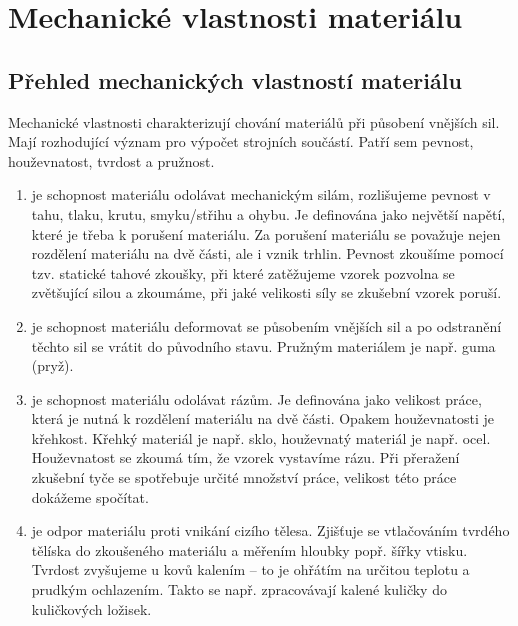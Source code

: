 \documentclass[letterpaper,10pt,english]{jupyterBook}
\begin{document}
\chapter{Mechanické vlastnosti materiálu}
\label{\detokenize{Prednasky/2_1_Mechanick_xe9_vlastnosti_materi_xe1lu:mechanicke-vlastnosti-materialu}}\label{\detokenize{Prednasky/2_1_Mechanick_xe9_vlastnosti_materi_xe1lu::doc}}

\section{Přehled mechanických vlastností materiálu}
\label{\detokenize{Prednasky/2_1_Mechanick_xe9_vlastnosti_materi_xe1lu:prehled-mechanickych-vlastnosti-materialu}}
\sphinxAtStartPar
Mechanické vlastnosti charakterizují chování materiálů při působení vnějších sil. Mají rozhodující význam pro výpočet strojních součástí. Patří sem pevnost, houževnatost, tvrdost a pružnost.
\begin{enumerate}
%
\item {} 
\sphinxAtStartPar
{} je schopnost materiálu odolávat mechanickým silám, rozlišujeme pevnost v tahu, tlaku, krutu, smyku/střihu a ohybu. Je definována jako největší napětí, které je třeba k porušení materiálu. Za porušení materiálu se považuje nejen rozdělení materiálu na dvě části, ale i vznik trhlin. Pevnost zkoušíme pomocí tzv. statické tahové zkoušky, při které zatěžujeme vzorek pozvolna se zvětšující silou a zkoumáme, při jaké velikosti síly se zkušební vzorek poruší.

\item {} 
\sphinxAtStartPar
{} je schopnost materiálu deformovat se působením vnějších sil a po odstranění těchto sil se vrátit do původního stavu. Pružným materiálem je např. guma (pryž).

\item {} 
\sphinxAtStartPar
{} je schopnost materiálu odolávat rázům. Je definována jako velikost práce, která je nutná k rozdělení materiálu na dvě části. Opakem houževnatosti je křehkost. Křehký materiál je např. sklo, houževnatý materiál je např. ocel. Houževnatost se zkoumá tím, že vzorek vystavíme rázu. Při přeražení zkušební tyče se spotřebuje určité množství práce, velikost této práce dokážeme spočítat.

\item {} 
\sphinxAtStartPar
{} je odpor materiálu proti vnikání cizího tělesa. Zjišťuje se vtlačováním tvrdého tělíska do zkoušeného materiálu a měřením hloubky popř. šířky vtisku. Tvrdost zvyšujeme u kovů kalením – to je ohřátím na určitou teplotu a prudkým ochlazením. Takto se např. zpracovávají kalené kuličky do kuličkových ložisek.

\end{enumerate}
\end{document}

